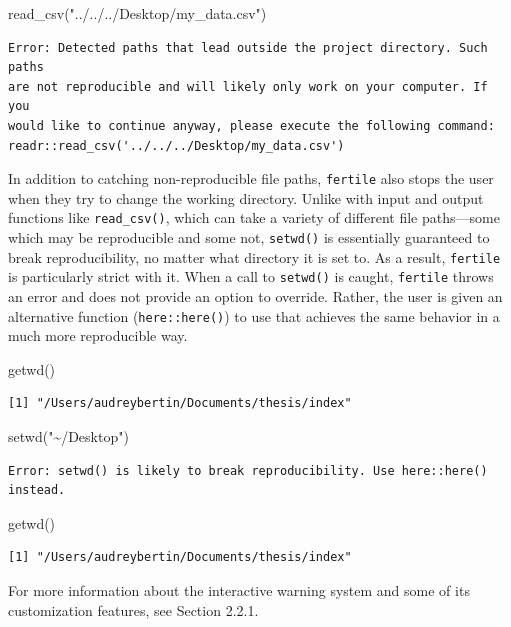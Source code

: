 \documentclass[12pt,twoside]{reedthesis}
\newenvironment{Shaded}{\begin{snugshade}}{\end{snugshade}}
\newcommand{\FunctionTok}[1]{\textcolor[rgb]{0.00,0.00,0.00}{#1}}
\newcommand{\NormalTok}[1]{#1}
\newcommand{\StringTok}[1]{\textcolor[rgb]{0.31,0.60,0.02}{#1}}
\begin{document}
\begin{Shaded}
\begin{Highlighting}[]
\FunctionTok{read\_csv}\NormalTok{(}\StringTok{"../../../Desktop/my\_data.csv"}\NormalTok{)}
\end{Highlighting}
\end{Shaded}
\begin{verbatim}
Error: Detected paths that lead outside the project directory. Such paths
are not reproducible and will likely only work on your computer. If you
would like to continue anyway, please execute the following command:
readr::read_csv('../../../Desktop/my_data.csv')
\end{verbatim}
In addition to catching non-reproducible file paths, \texttt{fertile} also stops the user when they try to change the working directory. Unlike with input and output functions like \texttt{read\_csv()}, which can take a variety of different file paths---some which may be reproducible and some not, \texttt{setwd()} is essentially guaranteed to break reproducibility, no matter what directory it is set to. As a result, \texttt{fertile} is particularly strict with it. When a call to \texttt{setwd()} is caught, \texttt{fertile} throws an error and does not provide an option to override. Rather, the user is given an alternative function (\texttt{here::here()}) to use that achieves the same behavior in a much more reproducible way.
\begin{Shaded}
\begin{Highlighting}[]
\FunctionTok{getwd}\NormalTok{()}
\end{Highlighting}
\end{Shaded}
\begin{verbatim}
[1] "/Users/audreybertin/Documents/thesis/index"
\end{verbatim}
\begin{Shaded}
\begin{Highlighting}[]
\FunctionTok{setwd}\NormalTok{(}\StringTok{"\textasciitilde{}/Desktop"}\NormalTok{)}
\end{Highlighting}
\end{Shaded}
\begin{verbatim}
Error: setwd() is likely to break reproducibility. Use here::here() instead.
\end{verbatim}
\begin{Shaded}
\begin{Highlighting}[]
\FunctionTok{getwd}\NormalTok{()}
\end{Highlighting}
\end{Shaded}
\begin{verbatim}
[1] "/Users/audreybertin/Documents/thesis/index"
\end{verbatim}
For more information about the interactive warning system and some of its customization features, see Section 2.2.1.
\end{document}
